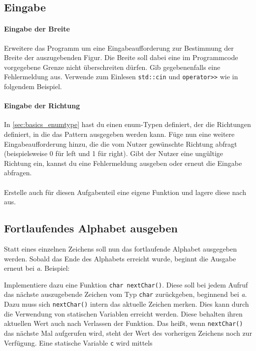 \subsection{Eingabe}
\paragraph{Eingabe der Breite}
Erweitere das Programm um eine Eingabeaufforderung zur Bestimmung der Breite der auszugebenden Figur.
Die Breite soll dabei eine im Programmcode vorgegebene Grenze nicht überschreiten dürfen. 
Gib gegebenenfalls eine Fehlermeldung aus.
Verwende zum Einlesen \lstinline{std::cin} und \lstinline{operator>>} wie in folgendem Beispiel.

  
\paragraph{Eingabe der Richtung}
In \ref{sec:basics_enumtype} hast du einen enum-Typen definiert, der die Richtungen definiert, in die das Pattern ausgegeben werden kann. 
Füge nun eine weitere Eingabeaufforderung hinzu, die die vom Nutzer gewünschte Richtung abfragt (beispielsweise 0 für left und 1 für right). 
Gibt der Nutzer eine ungültige Richtung ein, kannst du eine Fehlermeldung ausgeben oder erneut die Eingabe abfragen.\\
\\
Erstelle auch für diesen Aufgabenteil eine eigene Funktion und lagere diese nach  aus.

\subsection{Fortlaufendes Alphabet ausgeben}
Statt eines einzelnen Zeichens soll nun das fortlaufende Alphabet ausgegeben werden.
Sobald das Ende des Alphabets erreicht wurde, beginnt die Ausgabe erneut bei \emph{a}.
Beispiel:


Implementiere dazu eine Funktion \lstinline{char nextChar()}.
Diese soll bei jedem Aufruf das nächste auszugebende Zeichen vom Typ \lstinline{char} zurückgeben, beginnend bei \emph{a}.
Dazu muss sich \lstinline{nextChar()} intern das aktuelle Zeichen merken.
Dies kann durch die Verwendung von statischen Variablen erreicht werden. 
Diese behalten ihren aktuellen Wert auch nach Verlassen der Funktion. 
Das heißt, wenn \lstinline{nextChar()} das nächste Mal aufgerufen wird, steht der Wert des vorherigen Zeichens noch zur Verfügung.
Eine statische Variable \lstinline{c} wird mittels

